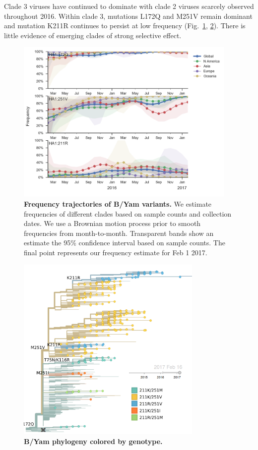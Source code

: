 \documentclass[11pt,oneside,letterpaper]{article}
\begin{document}
\pagebreak

Clade 3 viruses have continued to dominate with clade 2 viruses scarcely observed throughout 2016.
Within clade 3, mutations L172Q and M251V remain dominant and mutation K211R continues to persist at low frequency (Fig.\ \ref{Yam_mutations}, \ref{Yam_tree}). There is little evidence of emerging clades of strong selective effect.

\begin{figure}[H]
	\centering
	\includegraphics[width=0.95\textwidth]{../figures/feb-2017/Yam_mutations.png}
	\caption{\textbf{Frequency trajectories of B/Yam variants.}
	We estimate frequencies of different clades based on sample counts and collection dates.
	We use a Brownian motion process prior to smooth frequencies from month-to-month.
	Transparent bands show an estimate the 95\% confidence interval based on sample counts.
	The final point represents our frequency estimate for Feb 1 2017.
	}
	\label{Yam_mutations}
\end{figure}

\begin{figure}[H]
	\centering
	\includegraphics[width=0.8\textwidth]{../figures/feb-2017/Yam_tree.png}
	\caption{\textbf{B/Yam phylogeny colored by genotype.}
	}
	\label{Yam_tree}
\end{figure}
\end{document}

